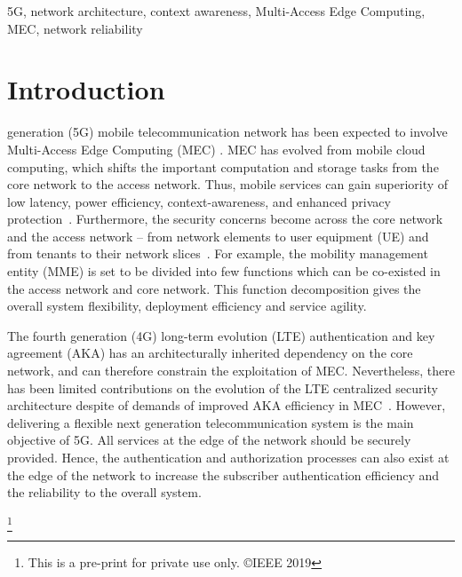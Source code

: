 \documentclass{ieeeaccess}
\newcommand\blfootnote[1]{%
	\begingroup
	\renewcommand\thefootnote{}\footnote{#1}%
	\addtocounter{footnote}{-1}%
	\endgroup
}
\newcommand{\change}[1]{#1}
\begin{document}
	\begin{keywords}
		5G, network architecture, context awareness, \change{Multi-Access Edge Computing}, MEC, network reliability
	\end{keywords}
	
	\titlepgskip=-15pt
	
	\maketitle
	
	\section{Introduction}
	 generation (5G) mobile telecommunication network has been expected to involve \change{Multi-Access Edge} Computing (MEC) \cite{barbarossa2014communicating,sabella2016mobile,corcoran2016mobile}. MEC has evolved from mobile cloud computing, which shifts the important computation and storage tasks from the core network to the access network. Thus, mobile services can gain \change{superiority} of low latency, power efficiency, context-awareness, and enhanced privacy protection~\cite{mao2017survey,abbas2018mobile}. Furthermore, the security concerns become across the core network and the access network -- from network elements to user equipment (UE) and from tenants to their network slices~\cite{lal2017nfv}. For example, the mobility management entity (MME) is set to be divided into few functions which can be co-existed in the access network and core network. This function decomposition gives the overall system flexibility, deployment efficiency and service agility.
	
	The fourth generation (4G) long-term evolution (LTE) authentication and key agreement (AKA) has an architecturally inherited dependency on the core network, and can therefore constrain the exploitation of MEC. Nevertheless, there has been limited contributions on the evolution of the LTE centralized security architecture despite of demands of improved AKA efficiency in MEC~\cite{li2018security}. However, delivering a flexible next generation telecommunication system is the main objective of 5G. All services at the edge of the network should be securely provided. Hence, the authentication and authorization processes can also exist at the edge of the network to increase the subscriber authentication efficiency and the reliability to the overall system.
	
	\blfootnote{This is a pre-print for private use only. \copyright IEEE 2019}
	
\end{document}
